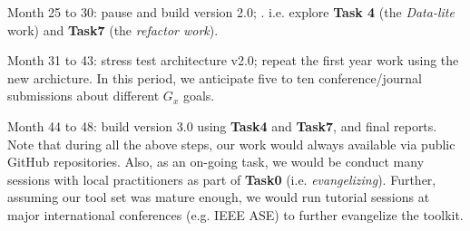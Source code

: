 \item Month 25 to 30: pause and build version 2.0; . i.e. explore {\bf Task 4} (the {\em Data-lite} work) and {\bf Task7} (the {\em refactor work}).
\item Month 31 to 43: stress test architecture v2.0; repeat the first year work using the new archicture. In this period,
we anticipate five to ten conference/journal submissions about different $G_x$ goals.
\item Month 44 to 48:    build version 3.0 using {\bf Task4} and {\bf Task7}, and final reports.
\ei
Note that during all the above steps, our work would always available via public GitHub repositories. Also, as an on-going task,
we would be conduct many sessions with local practitioners as part of {\bf Task0} (i.e. {\em evangelizing}). Further, assuming our
tool set was mature enough, we would run tutorial sessions at major international conferences (e.g. IEEE ASE) to further evangelize the toolkit.








 





